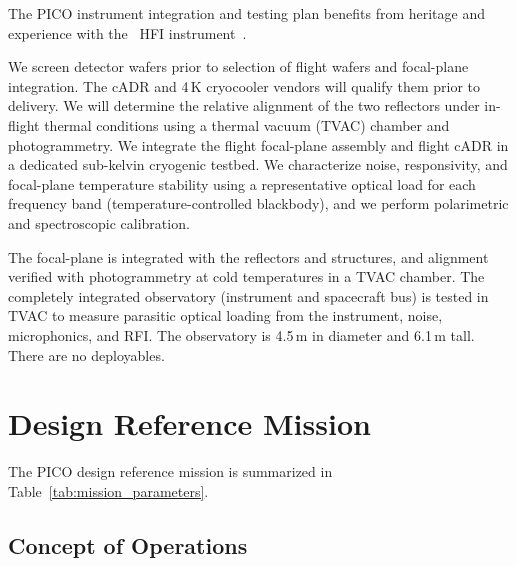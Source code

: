 The PICO instrument integration and testing plan benefits from heritage and experience with the \planck\ HFI instrument~\citep{Pajot2010}.

We screen detector wafers prior to selection of flight wafers and focal-plane integration. The cADR and 4\,K cryocooler vendors will qualify them prior to delivery. We will determine the relative alignment of the two reflectors under in-flight thermal conditions using a thermal vacuum (TVAC) chamber and photogrammetry. We integrate the flight focal-plane assembly and flight cADR in a dedicated sub-kelvin cryogenic testbed. We characterize noise, responsivity, and focal-plane temperature stability using a representative optical load for each frequency band (temperature-controlled blackbody), and we perform polarimetric and spectroscopic calibration.



The focal-plane is integrated with the reflectors and structures, and alignment verified with photogrammetry at cold temperatures in a TVAC chamber.  The completely integrated observatory (instrument and spacecraft bus) is tested in TVAC to measure parasitic optical loading from the instrument, noise, microphonics, and RFI. The observatory is 4.5\,m in diameter and 6.1\,m tall. There are no deployables.

\section{Design Reference Mission}
\label{sec:design_reference} %
%

%
The PICO design reference mission is summarized in Table~\ref{tab:mission_parameters}.

\subsection{Concept of Operations}
\label{sec:operations} %

